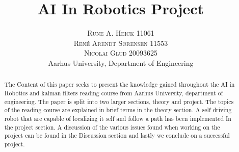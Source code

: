 


\title{\vspace{-15mm}\fontsize{24pt}{10pt}\selectfont\textbf{AI In Robotics Project}} %

\author{
\large
\textsc{Rune A. Heick 11061}\\
\textsc{René Arendt Sørensen 11553} \\ 
\textsc{Nicolai Glud 20093625}\\[2mm] %
\normalsize Aarhus University, Department of Engineering \\ %
\vspace{-5mm}
}
\date{}



\setlength{\abovedisplayskip}{1cm}
\setlength{\belowdisplayskip}{.8cm}
\maketitle %

\newpage

\begin{abstract}
The Content of this paper seeks to present the knowledge gained throughout the AI in Robotics and kalman filters reading course from Aarhus University, department of engineering. The paper is split into two larger sections,  theory and project. The topics of the reading course are explained in brief terms in the theory section.  A self driving robot that are capable of localizing it self and follow a path has been implemented In the project section. A discussion of the various issues found when working on the project can be found in the Discussion section and lastly we conclude on a successful project.
\end{abstract}
\tableofcontents


